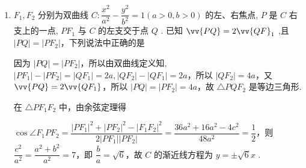 \begin{enumerate}
\begin{enumerate}
\begin{jieda}
\begin{enumerate}
                又因为 ${\left| P{F}_{1}\right| }^{2} + {\left| P{F}_{2}\right| }^{2} = {\left| {F}_{1}{F}_{2}\right| }^{2} = 4{c}^{2}$，所以 ${c}^{2} = {10}$ ,
                
                由 ${a}^{2} + {b}^{2} = {c}^{2}$ ,得 $1 + {b}^{2} = {10}$，所以 $b = 3$ .
            \end{enumerate}
        \end{jieda}
        \item ${F}_{1},{F}_{2}$ 分别为双曲线 $C : \dfrac{{x}^{2}}{{a}^{2}} - \dfrac{{y}^{2}}{{b}^{2}} = 1\left( {a > 0,b > 0}\right)$ 的左、右焦点, $P$ 是 $C$ 右支上的一点, $P{F}_{1}$ 与 $C$ 的左支交于点 $Q$ . 已知 $\vv{PQ} = 2{\vv{QF}}_{1}$ ,且 $\left| {PQ}\right|  = \left| {P{F}_{2}}\right|$，下列说法中正确的是
        \begin{jieda}
            因为 $\left| {PQ}\right|  = \left| {P{F}_{2}}\right|$，所以由双曲线定义知, $\left| {P{F}_{1}}\right|  - \left| {P{F}_{2}}\right|  = \left| {Q{F}_{1}}\right|  = {2a},\left| {Q{F}_{2}}\right|  - \left| {Q{F}_{1}}\right|  = {2a}$，所以 $\left| {Q{F}_{2}}\right|  = {4a}$，又 $\vv{PQ} = 2\vv{Q{F}_{1}}$，所以 $\left| {PQ}\right|  = \left| {P{F}_{2}}\right|  = {4a}$，故 $\bigtriangleup {PQ}{F}_{2}$ 是等边三角形. 
            
            在 $\bigtriangleup P{F}_{1}{F}_{2}$ 中，由余弦定理得
            
            $\cos \angle {F}_{1}P{F}_{2} = \dfrac{{\left| P{F}_{1}\right| }^{2} + {\left| P{F}_{2}\right| }^{2} - {\left| {F}_{1}{F}_{2}\right| }^{2}}{2\left| {P{F}_{1}}\right| \left| {P{F}_{2}}\right| } = \dfrac{{36}{a}^{2} + {16}{a}^{2} - 4{c}^{2}}{{48}{a}^{2}} = \dfrac{1}{2}$，则 $\dfrac{{c}^{2}}{{a}^{2}} = \dfrac{{a}^{2} + {b}^{2}}{{a}^{2}} = 7$，即 $\dfrac{b}{a} = \sqrt{6}$，故 $C$ 的渐近线方程为 $y =  \pm  \sqrt{6}x$ .
        \end{jieda}
        

\end{enumerate}
\end{enumerate}
